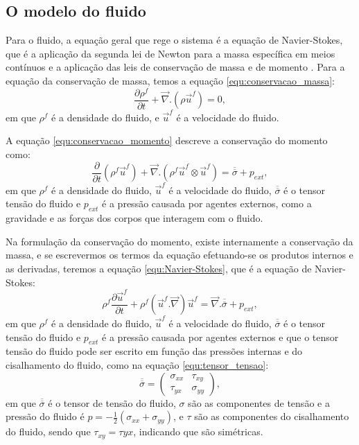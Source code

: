 \subsection{O modelo do fluido}
    Para o fluido, a equação geral que rege o sistema é a equação de Navier-Stokes, que é a aplicação da segunda lei de Newton para a massa específica em meios contínuos e a aplicação das leis de conservação de massa e de momento \cite{Physical_Hydrodynamics, Fluid_Mechanics}. Para a equação da conservação de massa, temos a equação \ref{equ:conservacao_massa}:
\begin{equation}
    \label{equ:conservacao_massa}
    \frac{\partial \rho^{f}}{\partial t} +\vec{\nabla}.(\rho \vec{u}^{f}) = 0,
\end{equation}
em que $\rho^{f}$ é a densidade do fluido, e $\vec{u}^{f}$ é a velocidade do fluido.

    A equação \ref{equ:conservacao_momento} descreve a conservação do momento como:
\begin{equation}
    \label{equ:conservacao_momento}
    \frac{\partial}{\partial t}\left(\rho^{f}\vec{u}^{f}\right) +\vec{\nabla}.\left(\rho^{f}\vec{u}^{f}\otimes\vec{u}^{f}\right) = \overline{\overline{\sigma}} +p_{ext},
\end{equation}
em que $\rho^{f}$ é a densidade do fluido, $\vec{u}^{f}$ é a velocidade do fluido, $\overline{\overline{\sigma}}$ é o tensor tensão do fluido e $p_{ext}$ é a pressão causada por agentes externos, como a gravidade e as forças dos corpos que interagem com o fluido.

    Na formulação da conservação do momento, existe internamente a conservação da massa, e se escrevermos os termos da equação efetuando-se os produtos internos e as derivadas, teremos a equação \ref{equ:Navier-Stokes}, que é a equação de Navier-Stokes:
\begin{equation}
    \label{equ:Navier-Stokes}
    \rho^{f} \frac{\partial \vec{u}^{f}}{\partial t} +\rho^{f}\left(\vec{u}^{f}.\vec{\nabla}\right)\vec{u}^{f} = \vec{\nabla}.\overline{\overline{\sigma}} +p_{ext},
\end{equation}
em que $\rho^{f}$ é a densidade do fluido, $\vec{u}^{f}$ é a velocidade do fluido, $\overline{\overline{\sigma}}$ é o tensor tensão do fluido e $p_{ext}$ é a pressão causada por agentes externos e que o tensor tensão do fluido pode ser escrito em função das pressões internas e do cisalhamento do fluido, como na equação \ref{equ:tensor_tensao}:
\begin{equation}
    \label{equ:tensor_tensao}
    \overline{\overline{\sigma}} = \left(
    \begin{matrix}
        \sigma_{xx} & \tau_{xy} \\
        \tau_{yx} & \sigma_{yy}
    \end{matrix}
    \right),
\end{equation}
em que $\overline{\overline{\sigma}}$ é o tensor de tensão do fluido, $\sigma$ são as componentes de tensão e a pressão do fluido é $p=-\frac{1}{2}(\sigma_{xx}+\sigma_{yy})$, e $\tau$ são as componentes do cisalhamento do fluido, sendo que $\tau_{xy} = \tau{yx}$, indicando que são simétricas.

